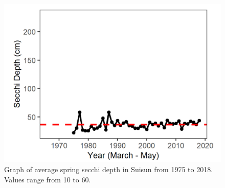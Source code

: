 \documentclass[
]{book}
\begin{document}
\begin{panel-grid}
\begin{columns-nocenter}
\begin{column800}
\begin{expand}
\end{expand}

\end{column800}

\begin{column40}

~

\end{column40}

\begin{column800}

\begin{expand}

\begin{figure}
\includegraphics[width=15.25in]{figures/secchi_ssspring} \caption{Graph of average spring secchi depth in Suisun from 1975 to 2018. Values range from 10 to 60.}\label{fig:unnamed-chunk-9}
\end{figure}

\end{expand}

\end{column800}

\begin{column40}

~

\end{column40}

\begin{column800}

\begin{expand}


\end{expand}
\end{column800}
\end{columns-nocenter}
\end{panel-grid}
\end{document}
